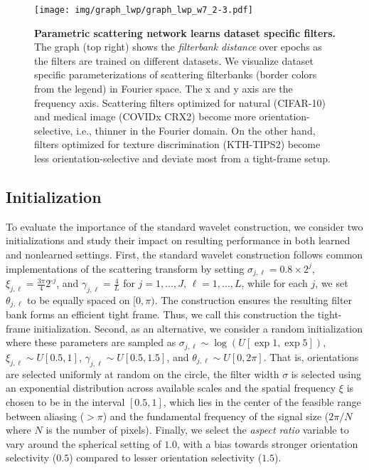 \documentclass[10pt,twocolumn,letterpaper]{article}
\begin{document}
\begin{figure*}[t]
    \centering
    \texttt{[image: img/graph\_lwp/graph\_lwp\_w7\_2-3.pdf]} 
    \vspace{-7pt}
    \caption{\textbf{Parametric scattering network learns dataset specific filters.} The graph (top right) shows the \textit{filterbank distance} over epochs as the filters are trained on different datasets. We visualize dataset specific parameterizations of scattering filterbanks (border colors from the legend) in Fourier space.  The x and y axis are the frequency axis. Scattering filters optimized for natural (CIFAR-10) and medical image (COVIDx CRX2) become more orientation-selective, i.e., thinner in the Fourier domain. On the other hand, filters optimized for texture discrimination (KTH-TIPS2) become less orientation-selective and deviate most from a tight-frame setup.\vspace{-10pt}}
    \label{fig:graphlwp}
\end{figure*}

\subsection{Initialization}
\label{sec:init}
To evaluate the importance of the standard wavelet construction, we consider two initializations and study their impact on resulting performance in both learned and nonlearned settings. First, the standard wavelet construction follows common implementations of the scattering transform by setting $\sigma_{j,\ell} = 0.8\times 2^j$, $\xi_{j,\ell} = \frac{3\pi}{4}2^{\textrm{-}j}$, and $\gamma_{j,\ell} = \frac{4}{L}$ for $j = 1,\ldots,J$, $\ell = 1,\ldots,L$, while for each $j$, we set $\theta_{j,\ell}$ to be equally spaced on $[0,\pi)$. The construction ensures the resulting filter bank forms an efficient tight frame. Thus, we call this construction the tight-frame initialization. Second, as an alternative, we consider a random initialization where these parameters are sampled as $\sigma_{j,\ell} \sim \log(U[\exp 1,\exp 5])$, $\xi_{j,\ell} \sim U[0.5,1]$, $\gamma_{j,\ell} \sim U[0.5,1.5]$, and $\theta_{j,\ell} \sim U[0,2\pi]$. That is, orientations are selected uniformly at random on the circle, the filter width $\sigma$ is selected using an exponential distribution across available scales and the spatial frequency $\xi$ is chosen to be in the interval $[0.5, 1]$, which lies in the center of the feasible range between aliasing ($>\pi$) and the fundamental frequency of the signal size ($2\pi / N$ where $N$ is the number of pixels). Finally, we select the \textit{aspect ratio} variable to vary around the spherical setting of $1.0$, with a bias towards stronger orientation selectivity ($0.5$) compared to lesser orientation selectivity ($1.5$).
\vspace{-3pt}
\end{document}

